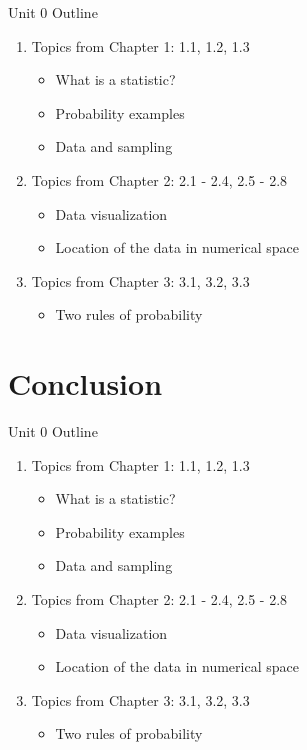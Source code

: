\documentclass{beamer}
\begin{document}
\begin{frame}{Unit 0 Outline}
\begin{enumerate}
\item Topics from Chapter 1: 1.1, 1.2, 1.3
\begin{itemize}
\item What is a statistic?
\item Probability examples
\item Data and sampling
\end{itemize}
\item Topics from Chapter 2: 2.1 - 2.4, 2.5 - 2.8
\begin{itemize}
\item Data visualization
\item Location of the data in numerical space
\end{itemize}
\item Topics from Chapter 3: 3.1, 3.2, 3.3
\begin{itemize}
\item Two rules of probability
\end{itemize}
\end{enumerate}
\end{frame}

\section{Conclusion}

\begin{frame}{Unit 0 Outline}
\begin{enumerate}
\item Topics from Chapter 1: 1.1, 1.2, 1.3
\begin{itemize}
\item What is a statistic?
\item Probability examples
\item Data and sampling
\end{itemize}
\item Topics from Chapter 2: 2.1 - 2.4, 2.5 - 2.8
\begin{itemize}
\item Data visualization
\item Location of the data in numerical space
\end{itemize}
\item Topics from Chapter 3: 3.1, 3.2, 3.3
\begin{itemize}
\item Two rules of probability
\end{itemize}
\end{enumerate}
\end{frame}
\end{document}
